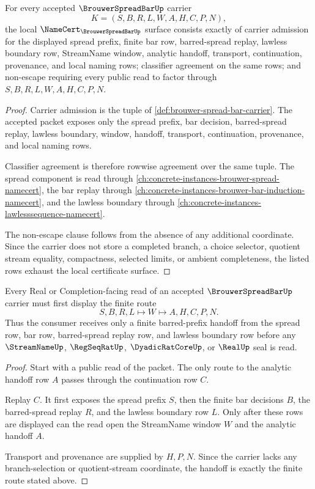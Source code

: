 \begin{theorem}
\label{thm:brouwer-spread-bar-namecert-obligations}
For every accepted $\BrouwerSpreadBarUp$ carrier
$$
K=(S,B,R,L,W,A,H,C,P,N),
$$
the local $\NameCert_{\BrouwerSpreadBarUp}$ surface consists exactly of carrier admission for the displayed spread prefix, finite bar row, barred-spread replay, lawless boundary row, StreamName window, analytic handoff, transport, continuation, provenance, and local naming rows; classifier agreement on the same rows; and non-escape requiring every public read to factor through $S,B,R,L,W,A,H,C,P,N$.
\end{theorem}
\begin{proof}
Carrier admission is the tuple of \autoref{def:brouwer-spread-bar-carrier}. The accepted packet exposes only the spread prefix, bar decision, barred-spread replay, lawless boundary, window, handoff, transport, continuation, provenance, and local naming rows.

Classifier agreement is therefore rowwise agreement over the same tuple. The spread component is read through \autoref{ch:concrete-instances-brouwer-spread-namecert}, the bar replay through \autoref{ch:concrete-instances-brouwer-bar-induction-namecert}, and the lawless boundary through \autoref{ch:concrete-instances-lawlesssequence-namecert}.

The non-escape clause follows from the absence of any additional coordinate. Since the carrier does not store a completed branch, a choice selector, quotient stream equality, compactness, selected limits, or ambient completeness, the listed rows exhaust the local certificate surface.
\end{proof}

\begin{theorem}
\label{thm:brouwer-spread-bar-finite-bar-handoff}
Every Real or Completion-facing read of an accepted $\BrouwerSpreadBarUp$ carrier must first display the finite route
$$
S,B,R,L \longmapsto W \longmapsto A,H,C,P,N .
$$
Thus the consumer receives only a finite barred-prefix handoff from the spread row, bar row, barred-spread replay row, and lawless boundary row before any $\StreamNameUp$, $\RegSeqRatUp$, $\DyadicRatCoreUp$, or $\RealUp$ seal is read.
\end{theorem}
\begin{proof}
Start with a public read of the packet. The only route to the analytic handoff row $A$ passes through the continuation row $C$.

Replay $C$. It first exposes the spread prefix $S$, then the finite bar decisions $B$, the barred-spread replay $R$, and the lawless boundary row $L$. Only after these rows are displayed can the read open the StreamName window $W$ and the analytic handoff $A$.

Transport and provenance are supplied by $H,P,N$. Since the carrier lacks any branch-selection or quotient-stream coordinate, the handoff is exactly the finite route stated above.
\end{proof}

